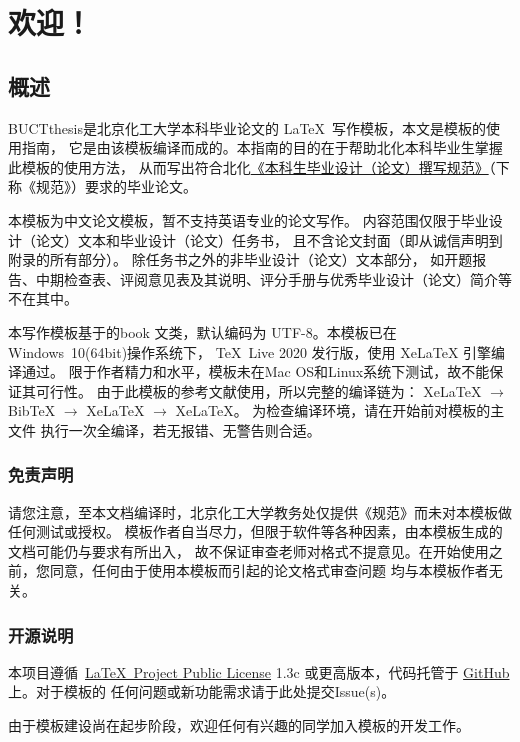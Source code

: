 \chapter{欢迎！}
\section{概述}
BUCTthesis是北京化工大学本科毕业论文的 \LaTeX\ 写作模板，本文是模板的使用指南，
它是由该模板编译而成的。本指南的目的在于帮助北化本科毕业生掌握此模板的使用方法，
从而写出符合北化\href{https://jiaowuchu.buct.edu.cn/2018/1009/c515a22046/page.htm}%
{《本科生毕业设计（论文）撰写规范》}（下称《规范》）要求的毕业论文。

本模板为中文论文模板，暂不支持英语专业的论文写作。
内容范围仅限于毕业设计（论文）文本和毕业设计（论文）任务书，
且不含论文封面（即从诚信声明到附录的所有部分）。
除任务书之外的非毕业设计（论文）文本部分，
如开题报告、中期检查表、评阅意见表及其说明、评分手册与优秀毕业设计（论文）简介等不在其中。


本写作模板基于\CTeX{}的book 文类，默认编码为 UTF-8。本模板已在Windows\ 10(64bit)操作系统下，
\TeX\ Live 2020 发行版，使用 XeLaTeX 引擎编译通过。
限于作者精力和水平，模板未在Mac OS和Linux系统下测试，故不能保证其可行性。
由于此模板的参考文献使用\BibTeX{}，所以完整的编译链为：
XeLaTeX $\to$ BibTeX{} $\to$ XeLaTeX{} $\to$ XeLaTeX{}。
为检查编译环境，请在开始前对模板的主文件  执行一次全编译，若无报错、无警告则合适。

\subsection{免责声明}
请您注意，至本文档编译时，北京化工大学教务处仅提供《规范》而未对本模板做任何测试或授权。
模板作者自当尽力，但限于软件等各种因素，由本模板生成的文档可能仍与要求有所出入，
故不保证审查老师对格式不提意见。在开始使用之前，您同意，任何由于使用本模板而引起的论文格式审查问题
均与本模板作者无关。

\subsection{开源说明}
本项目遵循~\href{https://www.latex-project.org/lppl.txt}{\LaTeX\ Project Public License} 1.3c
或更高版本，代码托管于 \href{https://github.com/Miracle0565/BUCTthesis}{GitHub} 上。对于模板的
任何问题或新功能需求请于此处提交Issue(s)。

由于模板建设尚在起步阶段，欢迎任何有兴趣的同学加入模板的开发工作。

